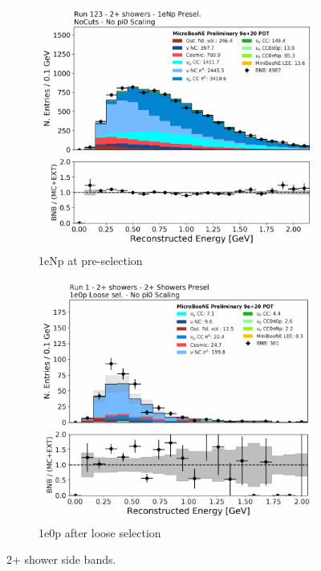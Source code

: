 \begin{figure}[H] 
\begin{center}
    \begin{subfigure}[b]{0.45\textwidth}
    \centering
    \includegraphics[width=1.00\textwidth]{Fakedata/set5/np_2shr.pdf}
    \caption{\label{fig:fakedata:set5:2shrnp} 1eNp at pre-selection}
    \end{subfigure}
    \begin{subfigure}[b]{0.45\textwidth}
    \centering
    \includegraphics[width=1.00\textwidth]{Fakedata/set5/zp_2shr.pdf}
    \caption{\label{fig:fakedata:set5:2shr0p} 1e0p after loose selection}
    \end{subfigure}
\caption{\label{fig:fakedata:set5:2shr} 2+ shower side bands.}
\end{center}
\end{figure}

